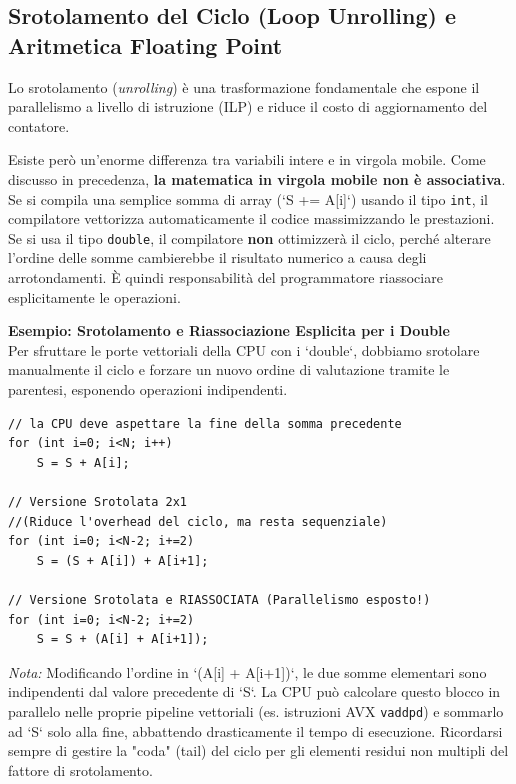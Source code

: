 \subsection{Srotolamento del Ciclo (Loop Unrolling) e Aritmetica Floating Point}
Lo srotolamento (\textit{unrolling}) è una trasformazione fondamentale che espone il parallelismo a livello di istruzione (ILP) e riduce il costo di aggiornamento del contatore.

Esiste però un'enorme differenza tra variabili intere e in virgola mobile. Come discusso in precedenza, \textbf{la matematica in virgola mobile non è associativa}. Se si compila una semplice somma di array (`S += A[i]`) usando il tipo \texttt{int}, il compilatore vettorizza automaticamente il codice massimizzando le prestazioni. Se si usa il tipo \texttt{double}, il compilatore \textbf{non} ottimizzerà il ciclo, perché alterare l'ordine delle somme cambierebbe il risultato numerico a causa degli arrotondamenti. È quindi responsabilità del programmatore riassociare esplicitamente le operazioni.

\begin{framed}
\noindent
\footnotesize
\textbf{Esempio: Srotolamento e Riassociazione Esplicita per i Double} \\
Per sfruttare le porte vettoriali della CPU con i `double`, dobbiamo srotolare manualmente il ciclo e forzare un nuovo ordine di valutazione tramite le parentesi, esponendo operazioni indipendenti.

\begin{verbatim}
// la CPU deve aspettare la fine della somma precedente
for (int i=0; i<N; i++)
    S = S + A[i];

// Versione Srotolata 2x1 
//(Riduce l'overhead del ciclo, ma resta sequenziale)
for (int i=0; i<N-2; i+=2)
    S = (S + A[i]) + A[i+1];

// Versione Srotolata e RIASSOCIATA (Parallelismo esposto!)
for (int i=0; i<N-2; i+=2)
    S = S + (A[i] + A[i+1]);
\end{verbatim}
\vspace{0.3cm}
\noindent
\textit{Nota:} Modificando l'ordine in `(A[i] + A[i+1])`, le due somme elementari sono indipendenti dal valore precedente di `S`. La CPU può calcolare questo blocco in parallelo nelle proprie pipeline vettoriali (es. istruzioni AVX \texttt{vaddpd}) e sommarlo ad `S` solo alla fine, abbattendo drasticamente il tempo di esecuzione. Ricordarsi sempre di gestire la "coda" (tail) del ciclo per gli elementi residui non multipli del fattore di srotolamento.
\end{framed}

